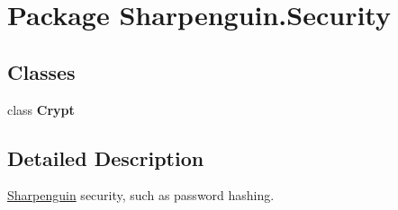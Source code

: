 \hypertarget{namespaceSharpenguin_1_1Security}{\section{\-Package \-Sharpenguin.\-Security}
\label{namespaceSharpenguin_1_1Security}
}
\subsection*{\-Classes}
\begin{DoxyCompactItemize}
\item 
class {\bfseries \-Crypt}
\end{DoxyCompactItemize}


\subsection{\-Detailed \-Description}
\hyperlink{namespaceSharpenguin}{\-Sharpenguin} security, such as password hashing. 
